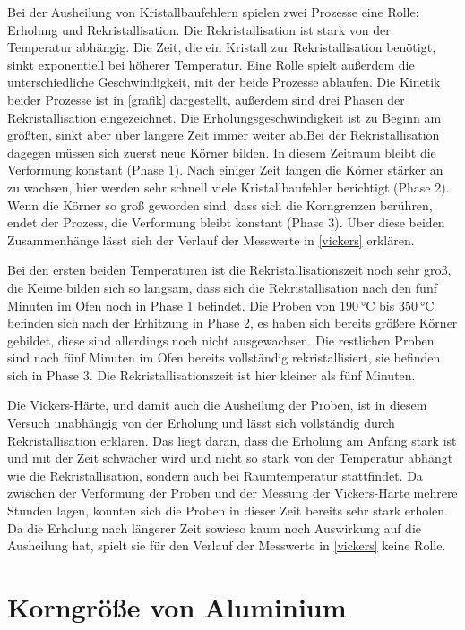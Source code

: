 \documentclass[
	a4paper,
	12pt,
	pagesize,
	ngerman
]{scrartcl}
\begin{document}
Bei der Ausheilung von Kristallbaufehlern spielen zwei Prozesse eine Rolle: Erholung und Rekristallisation. Die Rekristallisation ist stark von der Temperatur abhängig. Die Zeit, die ein Kristall zur Rekristallisation benötigt, sinkt exponentiell bei höherer Temperatur. Eine Rolle spielt außerdem die unterschiedliche Geschwindigkeit, mit der beide Prozesse ablaufen. Die Kinetik beider Prozesse ist in \cref{grafik} dargestellt, außerdem sind drei Phasen der Rekristallisation eingezeichnet. Die Erholungsgeschwindigkeit ist zu Beginn am größten, sinkt aber über längere Zeit immer weiter ab.Bei der Rekristallisation dagegen müssen sich zuerst neue Körner bilden. In diesem Zeitraum bleibt die Verformung konstant (Phase 1). Nach einiger Zeit fangen die Körner stärker an zu wachsen, hier werden sehr schnell viele Kristallbaufehler berichtigt (Phase 2). Wenn die Körner so groß geworden sind, dass sich die Korngrenzen berühren, endet der Prozess, die Verformung bleibt konstant (Phase 3). Über diese beiden Zusammenhänge lässt sich der Verlauf der Messwerte in \cref{vickers} erklären.

Bei den ersten beiden Temperaturen ist die Rekristallisationszeit noch sehr groß, die Keime bilden sich so langsam, dass sich die Rekristallisation nach den fünf Minuten im Ofen noch in Phase 1 befindet. Die Proben von $\SI{190}{\degreeCelsius}$ bis $\SI{350}{\degreeCelsius}$ befinden sich nach der Erhitzung in Phase 2, es haben sich bereits größere Körner gebildet, diese sind allerdings noch nicht ausgewachsen. Die restlichen Proben sind nach fünf Minuten im Ofen bereits vollständig rekristallisiert, sie befinden sich in Phase 3. Die Rekristallisationszeit ist hier kleiner als fünf Minuten.

Die Vickers-Härte, und damit auch die Ausheilung der Proben, ist in diesem Versuch unabhängig von der Erholung und lässt sich vollständig durch Rekristallisation erklären. Das liegt daran, dass die Erholung am Anfang stark ist und mit der Zeit schwächer wird und nicht so stark von der Temperatur abhängt wie die Rekristallisation, sondern auch bei Raumtemperatur stattfindet. Da zwischen der Verformung der Proben und der Messung der Vickers-Härte mehrere Stunden lagen, konnten sich die Proben in dieser Zeit bereits sehr stark erholen. Da die Erholung nach längerer Zeit sowieso kaum noch Auswirkung auf die Ausheilung hat, spielt sie für den Verlauf der Messwerte in \cref{vickers} keine Rolle.

\section{Korngröße von Aluminium}
\end{document}
